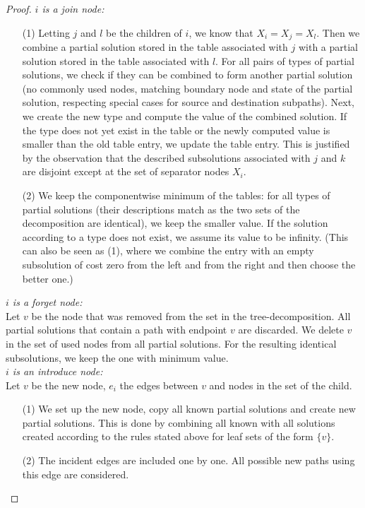 \documentclass[]{article}
\numberwithin{equation}{section}
\begin{document}
\begin{proof}
	\noindent\textit{$i$ is a join node:}
	\begin{enumerate}
		\item[(1)] Letting $j$ and $l$ be the children of $i$, we know that $X_i = X_j = X_l$. Then we combine a partial solution stored in the table associated with $j$ with a partial solution stored in the table associated with $l$. For all pairs of types of partial solutions, we check if they can be combined to form another partial solution (no commonly used nodes, matching boundary node and state of the partial solution, respecting special cases for source and destination subpaths). Next, we create the new type and compute the value of the combined solution. If the type does not yet exist in the table or the newly computed value is smaller than the old table entry, we update the table entry. This is justified by the observation that the described subsolutions associated with $j$ and $k$ are disjoint except at the set of separator nodes $X_i$.
		\item[(2)] We keep the componentwise minimum of the tables: for all types of partial solutions (their descriptions match as the two sets of the decomposition are identical), we keep the smaller value. If the solution according to a type does not exist, we assume its value to be infinity. (This can also be seen as (1), where we combine the entry with an empty subsolution of cost zero from the left and from the right and then choose the better one.) 
	\end{enumerate}
		
	\noindent\textit{$i$ is a forget node:}\\
	Let $v$ be the node that was removed from the set in the tree-decomposition. All partial solutions that contain a path with endpoint $v$ are discarded. We delete $v$ in the set of used nodes from all partial solutions. For the resulting identical subsolutions, we keep the one with minimum value.\\
	
	\noindent\textit{$i$ is an introduce node:}\\
	Let $v$ be the new node, $e_i$ the edges between $v$ and nodes in the set of the child.
	
	\begin{enumerate}
		\item[(1)] We set up the new node, copy all known partial solutions and create new partial solutions. This is done by combining all known with all solutions created according to the rules stated above for leaf sets of the form $\{v\}$.
		\item[(2)] The incident edges are included one by one. All possible new paths using this edge are considered.
	\end{enumerate}
	

\end{proof}
\end{document}
